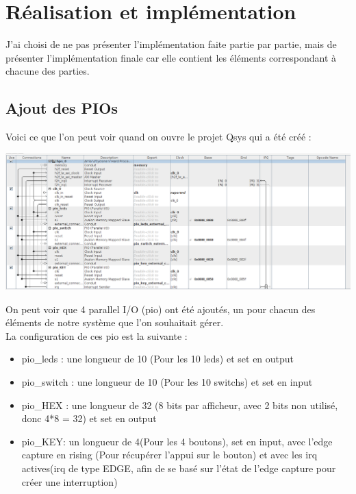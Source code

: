 \section{Réalisation et implémentation}

J'ai choisi de ne pas présenter l'implémentation faite partie par partie, mais de présenter l'implémentation finale car elle contient les éléments correspondant à chacune des parties. 

\subsection{Ajout des PIOs}

Voici ce que l'on peut voir quand on ouvre le projet Qsys qui a été créé : 

\includegraphics[scale=0.3]{./images/pios.png}

On peut voir que 4 parallel I/O (pio) ont été ajoutés, un pour chacun des éléments de notre système que l'on souhaitait gérer.\\

La configuration de ces pio est la suivante : \\

\begin{itemize}
	\item pio\_leds : une longueur de 10 (Pour les 10 leds) et set en output
	\item pio\_switch : une longueur de 10 (Pour les 10 switchs) et set en input
	\item pio\_HEX : une longueur de 32 (8 bits par afficheur, avec 2 bits non utilisé, donc 4*8 = 32) et set en output
	\item pio\_KEY: un longueur de 4(Pour les 4 boutons), set en input, avec l'edge capture en rising (Pour récupérer l'appui sur le bouton) et avec les irq actives(irq de type EDGE, afin de se basé sur l'état de l'edge capture pour créer une interruption)\\
\end{itemize}

